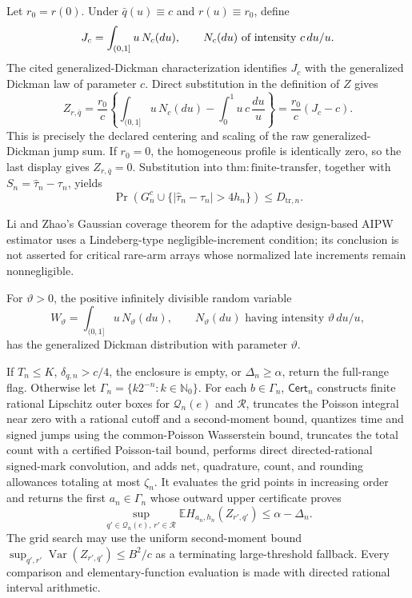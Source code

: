 Let \(r_0=r(0)\).  Under \(\bar q(u)\equiv c\) and
\(r(u)\equiv r_0\), define
\[
 J_c=\int_{(0,1]}u\,N_c(du),\qquad
 N_c(du)\ \hbox{of intensity }c\,du/u.
\]
The cited generalized-Dickman characterization identifies \(J_c\) with the generalized Dickman law of parameter \(c\).  Direct substitution in the definition of \(Z\) gives
\[
 Z_{r,\bar q}
 =\frac{r_0}{c}\left\{\int_{(0,1]}u\,N_c(du)
       -\int_0^1u\,c\,\frac{du}{u}\right\}
 =\frac{r_0}{c}(J_c-c).
\]
This is precisely the declared centering and scaling of the raw generalized-Dickman jump sum.  If \(r_0=0\), the homogeneous profile is identically zero, so the last display gives \(Z_{r,\bar q}=0\).  Substitution into
\(\mathrm{thm:finite\mbox{-}transfer}\), together with
\(S_n=\widehat\tau_n-\tau_n\), yields
\[
 \Pr\!\left(G_n^c\cup
 \{|\widehat\tau_n-\tau_n|>4h_n\}\right)
 \leq D_{\mathrm{tr},n}.
\]

Li and Zhao's Gaussian coverage theorem for the adaptive design-based AIPW estimator uses a Lindeberg-type negligible-increment condition; its conclusion is not asserted for critical rare-arm arrays whose normalized late increments remain nonnegligible.

For \(\vartheta>0\), the positive infinitely divisible random variable
\[
 W_\vartheta=\int_{(0,1]}u\,N_\vartheta(du),
 \qquad N_\vartheta(du)\text{ having intensity }\vartheta\,du/u,
\]
has the generalized Dickman distribution with parameter \(\vartheta\).

If \(T_n\leq K\), \(\delta_{q,n}>c/4\), the enclosure is empty, or
\(\Delta_n\geq\alpha\), return the full-range flag.  Otherwise let
\(\Gamma_n=\{k2^{-n}:k\in\mathbb N_0\}\).
For each \(b\in\Gamma_n\), \(\mathsf{Cert}_n\) constructs finite rational
Lipschitz outer boxes for \(\mathcal Q_n(e)\) and \(\mathcal R\), truncates the
Poisson integral near zero with a rational cutoff and a second-moment bound,
quantizes time and signed jumps using the common-Poisson Wasserstein bound,
truncates the total count with a certified Poisson-tail bound, performs direct
directed-rational signed-mark convolution, and adds net, quadrature, count, and
rounding allowances totaling at most \(\zeta_n\).  It evaluates the grid points
in increasing order and returns the first \(a_n\in\Gamma_n\) whose outward
upper certificate proves
\[
\sup_{q'\in\mathcal Q_n(e),\,r'\in\mathcal R}
\mathbb E H_{a_n,h_n}(Z_{r',q'})\leq\alpha-\Delta_n.
\]
The grid search may use the uniform second-moment bound
\(\sup_{q',r'}\operatorname{Var}(Z_{r',q'})\leq B^2/c\) as a terminating
large-threshold fallback.  Every comparison and elementary-function
evaluation is made with directed rational interval arithmetic.


